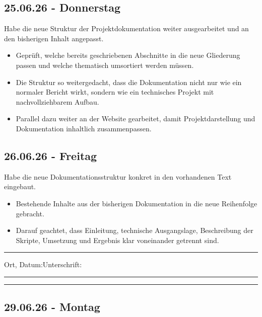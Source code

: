\subsection{25.06.26 - Donnerstag}

Habe die neue Struktur der Projektdokumentation weiter ausgearbeitet und an den bisherigen Inhalt angepasst.

\begin{itemize}
    \item Geprüft, welche bereits geschriebenen Abschnitte in die neue Gliederung passen und welche thematisch umsortiert werden müssen.
    \item Die Struktur so weitergedacht, dass die Dokumentation nicht nur wie ein normaler Bericht wirkt, sondern wie ein technisches Projekt mit nachvollziehbarem Aufbau.
    \item Parallel dazu weiter an der Website gearbeitet, damit Projektdarstellung und Dokumentation inhaltlich zusammenpassen.
\end{itemize}

\subsection{26.06.26 - Freitag}

Habe die neue Dokumentationsstruktur konkret in den vorhandenen Text eingebaut.

\begin{itemize}
    \item Bestehende Inhalte aus der bisherigen Dokumentation in die neue Reihenfolge gebracht.
    \item Darauf geachtet, dass Einleitung, technische Ausgangslage, Beschreibung der Skripte, Umsetzung und Ergebnis klar voneinander getrennt sind.
\end{itemize}

\vfill
\noindent\rule{\linewidth}{0.2pt}

\noindent Ort, Datum:\hfill Unterschrift:\\[0.5cm]
\noindent \rule{6cm}{0.9pt}\hfill \rule{6cm}{0.9pt}

\restoregeometry
\newpage


\vspace*{-2cm}

\subsection{29.06.26 - Montag}

